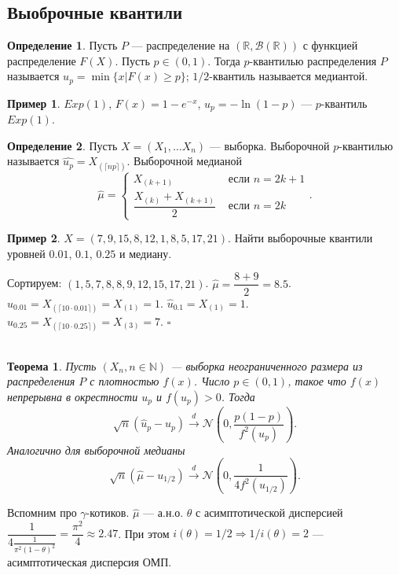 \documentclass[12pt]{report}
\newenvironment{solution}{{\bfseries Решение:}}{$\square$\\\\}
\newtheorem{theorem}{Теорема}
\theoremstyle{definition}
\newtheorem{definition}{Определение}
\newtheorem{example}{Пример}
\begin{document}
\subsection{Выоброчные квантили}
\begin{definition}
	Пусть $P$ — распределение на $(\mathbb{R}, \mathcal{B}(\mathbb{R}))$ с функцией распределение $F(X)$. Пусть $p \in (0, 1)$. Тогда $p$-квантилью распределения $P$ называется $u_p = \min \{x | F(x) \geqslant p\}$; $1/2$-квантиль называется медиантой.
\end{definition}
\begin{example}
	$Exp(1)$, $F(x) = 1 - e^{-x}$, $u_p = -\ln(1-p)$ — $p$-квантиль $Exp(1)$.
\end{example}
\begin{definition}
	Пусть $X = (X_1, \ldots X_n)$ — выборка. Выборочной $p$-квантилью называется $\hat{u_p} = X_{(\lceil np \rceil)}$. Выборочной медианой $$ \hat{\mu} = \begin{cases}
		X_{(k+1)} & \text{ если } n = 2k + 1\\
		\dfrac{X_{(k)} + X_{(k+1)}}{2} & \text{ если } n = 2k
	\end{cases}.$$
\end{definition}
\begin{example}
	$X = (7, 9, 15, 8, 12, 1, 8, 5, 17, 21)$. Найти выборочные квантили уровней $0.01$, $0.1$, $0.25$ и медиану.
\end{example}
\begin{solution}
	Сортируем: $(1, 5, 7, 8, 8, 9, 12, 15, 17, 21)$. $\hat{\mu} = \dfrac{8 + 9}{2} = 8.5$. $\hat{u}_{0.01} = X_{(\lceil 10 \cdot 0.01 \rceil)} = X_{(1)} = 1$.
	 $\hat{u}_{0.1} = X_{(1)} = 1$. $\hat{u}_{0.25} = X_{(\lceil 10 \cdot 0.25 \rceil)} = X_{(3)} = 7$.
\end{solution}
\begin{theorem}
	Пусть $ (X_n, n \in \mathbb{N})$ — выборка неограниченного размера из распределения $P$ с плотностью $f(x)$. Число $p \in (0, 1)$, такое что $f(x)$ непрерывна
	в окрестности $u_p$ и $f(u_p) > 0$. Тогда $$\sqrt{n}(\hat{u}_p - u_p) \xrightarrow{d} \mathcal{N}\left(0, \dfrac{p(1-p)}{f^2(u_p)}\right).$$
	Аналогично для выборочной медианы $$\sqrt{n}(\hat{\mu} - u_{1/2}) \xrightarrow{d} \mathcal{N}\left(0, \dfrac{1}{4f^2(u_{1/2})}\right).$$
\end{theorem}
Вспомним про $\gamma$-котиков. $\hat{\mu}$ — а.н.о. $\theta$ с асимптотической дисперсией $\dfrac{1}{4\frac{1}{\pi^2 (1-\theta)^2}} = \dfrac{\pi^2}{4} \approx 2.47$. При этом $i(\theta) = 1/2 \Rightarrow 1/ i(\theta) = 2$ — асимптотическая дисперсия ОМП.
\end{document}
